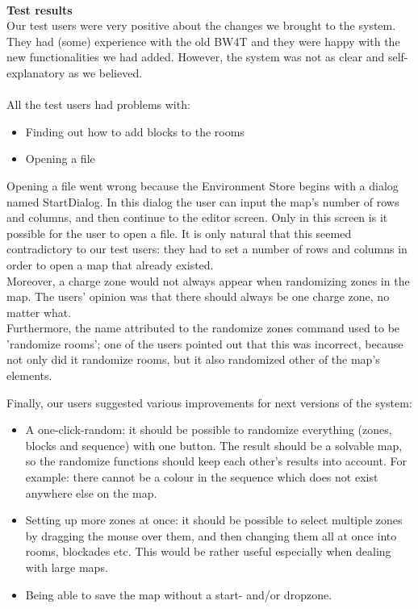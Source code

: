\documentclass[a4paper]{article}
\begin{document}
\\
\textbf{Test results}\\
Our test users were very positive about the changes we brought to the system. They had (some) experience with the old BW4T and they were happy with the new functionalities we had added. However, the system was not as clear and self-explanatory as we believed. \\
\\
All the test users had problems with:
\begin{itemize}
\item Finding out how to add blocks to the rooms
\item Opening a file
\end{itemize}

Opening a file went wrong because the Environment Store begins with a dialog named StartDialog. In this dialog the user can input the map's number of rows and columns, and then continue to the editor screen. Only in this screen is it possible for the user to open a file. It is only natural that this seemed contradictory to our test users: they had to set a number of rows and columns in order to open a map that already existed. \\

Moreover, a charge zone would not always appear when randomizing zones in the map. The users' opinion was that there should always be one charge zone, no matter what.\\
Furthermore, the name attributed to the randomize zones command used to be 'randomize rooms'; one of the users pointed out that this was incorrect, because not only did it randomize rooms, but it also randomized other of the map's elements. \\ \pagebreak

Finally, our users suggested various improvements for next versions of the system:
\begin{itemize}
\item A one-click-random: it should be possible to randomize everything (zones, blocks and sequence) with one button. The result should be a solvable map, so the randomize functions should keep each other's results into account. For example: there cannot be a colour in the sequence which does not exist anywhere else on the map.
\item Setting up more zones at once: it should be possible to select multiple zones by dragging the mouse over them, and then changing them all at once into rooms, blockades etc. This would be rather useful especially when dealing with large maps. 
\item Being able to save the map without a start- and/or dropzone. 
\end{itemize}
\end{document}
